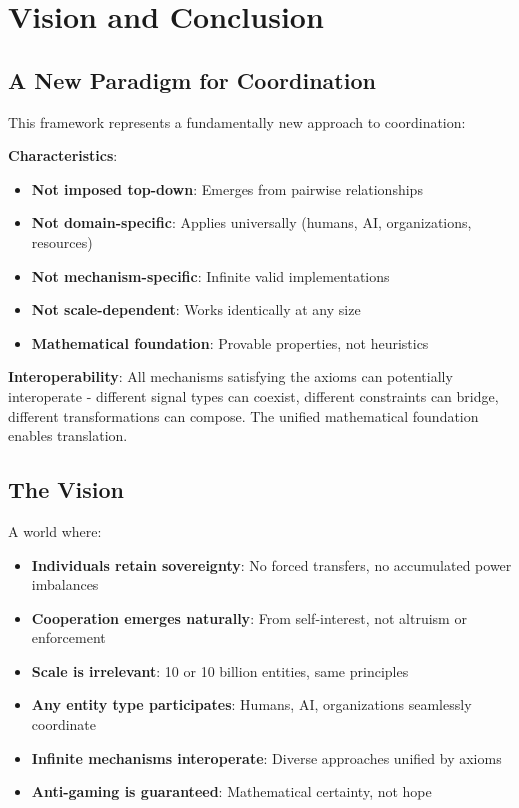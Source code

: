 \documentclass[11pt,a4paper]{article}
\theoremstyle{definition}
\theoremstyle{remark}
\begin{document}
\section{Vision and Conclusion}

\subsection{A New Paradigm for Coordination}

This framework represents a fundamentally new approach to coordination:

\textbf{Characteristics}:
\begin{itemize}
\item \textbf{Not imposed top-down}: Emerges from pairwise relationships
\item \textbf{Not domain-specific}: Applies universally (humans, AI, organizations, resources)
\item \textbf{Not mechanism-specific}: Infinite valid implementations
\item \textbf{Not scale-dependent}: Works identically at any size
\item \textbf{Mathematical foundation}: Provable properties, not heuristics
\end{itemize}

\textbf{Interoperability}: All mechanisms satisfying the axioms can potentially interoperate - different signal types can coexist, different constraints can bridge, different transformations can compose. The unified mathematical foundation enables translation.

\subsection{The Vision}

A world where:
\begin{itemize}
\item \textbf{Individuals retain sovereignty}: No forced transfers, no accumulated power imbalances
\item \textbf{Cooperation emerges naturally}: From self-interest, not altruism or enforcement
\item \textbf{Scale is irrelevant}: 10 or 10 billion entities, same principles
\item \textbf{Any entity type participates}: Humans, AI, organizations seamlessly coordinate
\item \textbf{Infinite mechanisms interoperate}: Diverse approaches unified by axioms
\item \textbf{Anti-gaming is guaranteed}: Mathematical certainty, not hope
\end{itemize}
\end{document}
